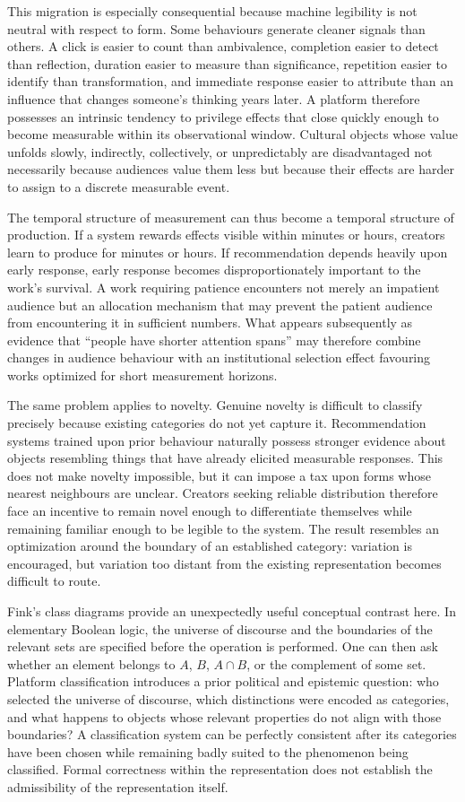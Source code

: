 \documentclass[11pt]{article}
\begin{document}
This migration is especially consequential because machine legibility is not neutral with respect to form. Some behaviours generate cleaner signals than others. A click is easier to count than ambivalence, completion easier to detect than reflection, duration easier to measure than significance, repetition easier to identify than transformation, and immediate response easier to attribute than an influence that changes someone's thinking years later. A platform therefore possesses an intrinsic tendency to privilege effects that close quickly enough to become measurable within its observational window. Cultural objects whose value unfolds slowly, indirectly, collectively, or unpredictably are disadvantaged not necessarily because audiences value them less but because their effects are harder to assign to a discrete measurable event.

The temporal structure of measurement can thus become a temporal structure of production. If a system rewards effects visible within minutes or hours, creators learn to produce for minutes or hours. If recommendation depends heavily upon early response, early response becomes disproportionately important to the work's survival. A work requiring patience encounters not merely an impatient audience but an allocation mechanism that may prevent the patient audience from encountering it in sufficient numbers. What appears subsequently as evidence that ``people have shorter attention spans'' may therefore combine changes in audience behaviour with an institutional selection effect favouring works optimized for short measurement horizons.

The same problem applies to novelty. Genuine novelty is difficult to classify precisely because existing categories do not yet capture it. Recommendation systems trained upon prior behaviour naturally possess stronger evidence about objects resembling things that have already elicited measurable responses. This does not make novelty impossible, but it can impose a tax upon forms whose nearest neighbours are unclear. Creators seeking reliable distribution therefore face an incentive to remain novel enough to differentiate themselves while remaining familiar enough to be legible to the system. The result resembles an optimization around the boundary of an established category: variation is encouraged, but variation too distant from the existing representation becomes difficult to route.

Fink's class diagrams provide an unexpectedly useful conceptual contrast here. In elementary Boolean logic, the universe of discourse and the boundaries of the relevant sets are specified before the operation is performed. One can then ask whether an element belongs to \(A\), \(B\), \(A \cap B\), or the complement of some set. Platform classification introduces a prior political and epistemic question: who selected the universe of discourse, which distinctions were encoded as categories, and what happens to objects whose relevant properties do not align with those boundaries? A classification system can be perfectly consistent after its categories have been chosen while remaining badly suited to the phenomenon being classified. Formal correctness within the representation does not establish the admissibility of the representation itself.
\end{document}
